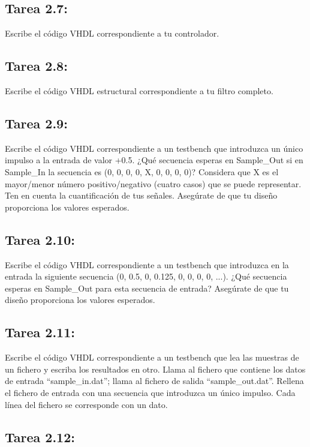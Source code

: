 \documentclass{article}
\begin{document}
\subsection{Tarea 2.7:}

Escribe el código VHDL correspondiente a tu controlador.

\subsection{Tarea 2.8:}

Escribe el código VHDL estructural correspondiente a tu filtro completo.

\subsection{Tarea 2.9:}

Escribe el código VHDL correspondiente a un testbench que introduzca un único impulso a la entrada de valor +0.5. ¿Qué secuencia esperas en Sample{\_}Out si en Sample{\_}In la secuencia es (0, 0, 0, 0, X, 0, 0, 0, 0)? Considera que X es el mayor/menor número positivo/negativo (cuatro casos) que se puede representar. Ten en cuenta la cuantificación
de tus señales. Asegúrate de que tu diseño proporciona los valores esperados.

\subsection{Tarea 2.10:}

Escribe el código VHDL correspondiente a un testbench que introduzca en la entrada
la siguiente secuencia (0, 0.5, 0, 0.125, 0, 0, 0, 0, ...). ¿Qué secuencia esperas en Sample{\_}Out para esta secuencia de entrada? Asegúrate de que tu diseño proporciona los valores esperados.

\subsection{Tarea 2.11:}
Escribe el código VHDL correspondiente a un testbench que lea las muestras de un fichero y escriba los resultados en otro.
Llama al fichero que contiene los datos de entrada “sample{\_}in.dat”; llama al fichero de salida “sample{\_}out.dat”.
Rellena el fichero de entrada con una secuencia que introduzca un único impulso.
Cada línea del fichero se corresponde con un dato.

\subsection{Tarea 2.12:}
\end{document}
